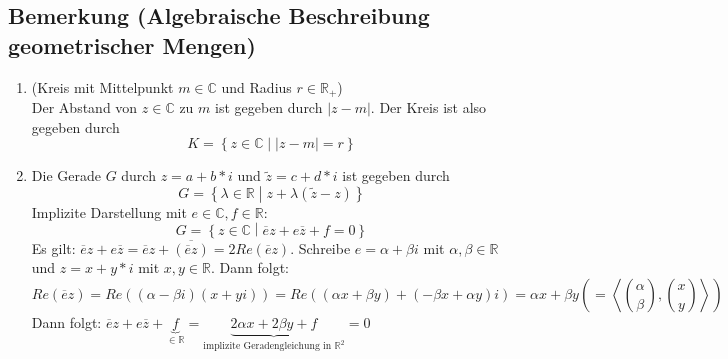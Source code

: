 \subsection{Bemerkung (Algebraische Beschreibung geometrischer Mengen)}
\begin{enumerate}
\item (Kreis mit Mittelpunkt $m \in \mathbb{C}$ und Radius $r \in \mathbb{R}_+$)\\
	Der Abstand von $z \in \mathbb{C}$ zu $m$ ist gegeben durch $|z - m|$.
	Der Kreis ist also gegeben durch
	\[K = \left\{ z \in \mathbb{C} \middle| |z - m| = r \right\} \]
\item Die Gerade $G$ durch $z = a + b * i$ und $\tilde{z} = c + d * i$ ist gegeben durch
	\[G = \left\{ \lambda \in \mathbb{R} \middle| z + \lambda (\tilde{z} - z) \right\} \]
	Implizite Darstellung  mit $e \in \mathbb{C}, f \in \mathbb{R}$:
	\[G = \left\{ z \in \mathbb{C} \middle| \overline{e} z + e \overline{z} + f = 0 \right\} \]
	Es gilt: $\overline{e} z + e \overline{z} = \overline{e} z + \overline{(\overline{e} z)} = 2 Re (\overline{e} z)$.
	Schreibe $e = \alpha + \beta i$ mit $\alpha, \beta \in \mathbb{R}$ und $z = x + y * i$ mit $x, y \in \mathbb{R}$.
	Dann folgt:
	\[Re(\overline{e} z) = Re ((\alpha - \beta i)(x + y i))
	= Re ((\alpha x + \beta y) + (-\beta x + \alpha y)i)
	= \alpha x + \beta y
	\left( = \left< \binom{\alpha}{\beta}, \binom{x}{y} \right> \right) \]
	Dann folgt: $\overline{e} z + e \overline {z} + \underbrace{f}_{\in \mathbb{R}} = \underbrace{2 \alpha x + 2 \beta y + f} _{\text{implizite Geradengleichung in }\mathbb{R}^2} = 0$
\end{enumerate}

